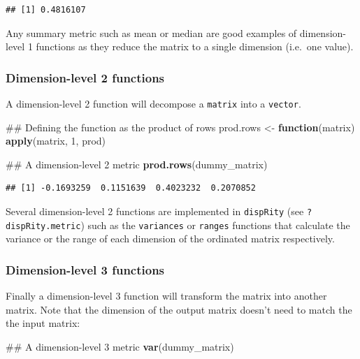 \documentclass[]{book}
\newenvironment{Shaded}{\begin{snugshade}}{\end{snugshade}}
\newcommand{\KeywordTok}[1]{\textcolor[rgb]{0.13,0.29,0.53}{\textbf{#1}}}
\newcommand{\DecValTok}[1]{\textcolor[rgb]{0.00,0.00,0.81}{#1}}
\newcommand{\StringTok}[1]{\textcolor[rgb]{0.31,0.60,0.02}{#1}}
\newcommand{\ControlFlowTok}[1]{\textcolor[rgb]{0.13,0.29,0.53}{\textbf{#1}}}
\newcommand{\NormalTok}[1]{#1}
\theoremstyle{definition}
\theoremstyle{definition}
\theoremstyle{definition}
\theoremstyle{remark}
\begin{document}
\begin{verbatim}
## [1] 0.4816107
\end{verbatim}

Any summary metric such as mean or median are good examples of
dimension-level 1 functions as they reduce the matrix to a single
dimension (i.e.~one value).

\subsubsection{Dimension-level 2
functions}\label{dimension-level-2-functions}

A dimension-level 2 function will decompose a \texttt{matrix} into a
\texttt{vector}.

\begin{Shaded}
\begin{Highlighting}[]
\NormalTok{## Defining the function as the product of rows}
\NormalTok{prod.rows <-}\StringTok{ }\ControlFlowTok{function}\NormalTok{(matrix) }\KeywordTok{apply}\NormalTok{(matrix, }\DecValTok{1}\NormalTok{, prod)}

\NormalTok{## A dimension-level 2 metric}
\KeywordTok{prod.rows}\NormalTok{(dummy_matrix)}
\end{Highlighting}
\end{Shaded}

\begin{verbatim}
## [1] -0.1693259  0.1151639  0.4023232  0.2070852
\end{verbatim}

Several dimension-level 2 functions are implemented in \texttt{dispRity}
(see \texttt{?dispRity.metric}) such as the \texttt{variances} or
\texttt{ranges} functions that calculate the variance or the range of
each dimension of the ordinated matrix respectively.

\subsubsection{Dimension-level 3
functions}\label{dimension-level-3-functions}

Finally a dimension-level 3 function will transform the matrix into
another matrix. Note that the dimension of the output matrix doesn't
need to match the the input matrix:

\begin{Shaded}
\begin{Highlighting}[]
\NormalTok{## A dimension-level 3 metric}
\KeywordTok{var}\NormalTok{(dummy_matrix)}
\end{Highlighting}
\end{Shaded}
\end{document}
